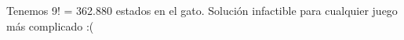 \documentclass[preview]{standalone}
\begin{document}
\begin{center}
\quad Tenemos 9! = 362.880 estados en el gato. Solución infactible para cualquier juego más complicado :(
\end{center}
\end{document}

